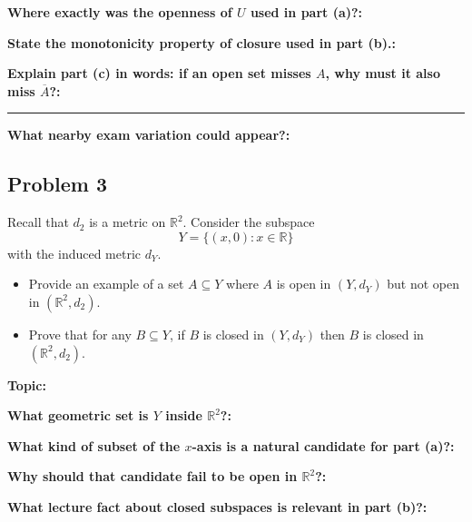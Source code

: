 \documentclass[12pt]{article}
\newcommand{\fillfield}[1]{%
  \par\noindent\textbf{#1:}\enspace\hrulefill\par\vspace{3pt}%
}
\newcommand{\fillfieldlong}[1]{%
  \par\noindent\textbf{#1:}\par\vspace{1.5cm}%
  \noindent\rule{\linewidth}{0.35pt}\par\vspace{4pt}%
}
\begin{document}
\bigskip

\begin{tcolorbox}[
  enhanced, breakable,
  colback  = reflectcyan,
  colframe = cyan!55!black,
  fonttitle = \bfseries,
  title = {\textsc{Reflection \& Variation}}
]
\fillfield{Where exactly was the openness of $U$ used in part (a)?}
\fillfield{State the monotonicity property of closure used in part (b).}
\fillfieldlong{Explain part (c) in words: if an open set misses $A$, why must it also miss $\overline A$?}
\fillfield{What nearby exam variation could appear?}
\end{tcolorbox}

\newpage
\subsection{Problem 3}

\begin{tcolorbox}[
  enhanced, breakable,
  colback  = probblue,
  colframe = blue!55!black,
  fonttitle = \bfseries,
  title = {\textsc{Problem Statement}\hfill Homework 9, Problem 3}
]
Recall that $d_2$ is a metric on $\mathbb{R}^2$. Consider the subspace
\[
  Y = \{(x, 0) : x \in \mathbb{R}\}
\]
with the induced metric $d_Y$.
\begin{itemize}[nosep, leftmargin=1.8em]
  \item[(a)] Provide an example of a set $A \subseteq Y$ where $A$ is open in $(Y, d_Y)$ but not open in $(\mathbb{R}^2, d_2)$.
  \item[(b)] Prove that for any $B \subseteq Y$, if $B$ is closed in $(Y, d_Y)$ then $B$ is closed in $(\mathbb{R}^2, d_2)$.
\end{itemize}
\end{tcolorbox}

\bigskip

\begin{tcolorbox}[
  enhanced, breakable,
  colback  = pass1green,
  colframe = green!55!black,
  fonttitle = \bfseries,
  title = {Pass 1 \enspace\textbf{--}\enspace First Diagnosis}
]
\fillfield{Topic}
\fillfield{What geometric set is $Y$ inside $\mathbb{R}^2$?}
\fillfield{What kind of subset of the $x$-axis is a natural candidate for part (a)?}
\fillfield{Why should that candidate fail to be open in $\mathbb{R}^2$?}
\fillfield{What lecture fact about closed subspaces is relevant in part (b)?}
\end{tcolorbox}
\end{document}
